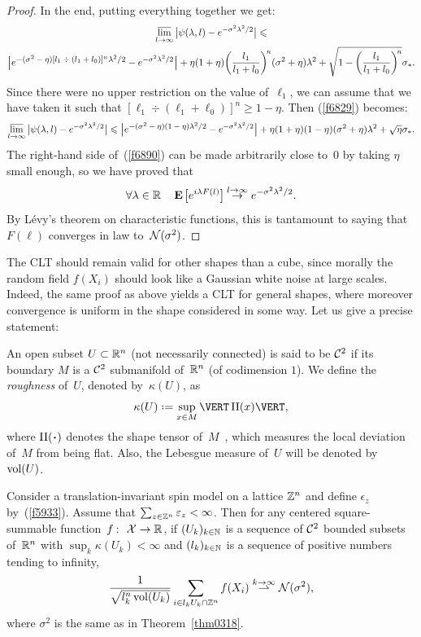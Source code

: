 \begin{proof}
In the end, putting everything together we get:
\begin{multline}\label{f6829}
\limsup_{\ell\longto\infty} \big| \psi(\lambda,\ell) - e^{-\sigma^2\lambda^2/2} \big| \leq \\
\Big|e^{\big{-(\sigma^2-\eta) [\ell_1 \div (\ell_1+\ell_0)]^n \lambda^2/2}} - e^{-\sigma^2\lambda^2/2}\Big|
+ \eta(1+\eta) \bigg( \frac{\ell_1}{\ell_1+\ell_0} \bigg)^{\!n} (\sigma^2+\eta) \lambda^2
+ \sqrt{ 1-\bigg(\frac{\ell_1}{\ell_1+\ell_0}\bigg)^{\!n} } \sigma_* .
\end{multline}
%
Since there were no upper restriction on the value of~$\ell_1$, we can assume
that we have taken it such that $[\ell_1 \div (\ell_1+\ell_0)]^n \geq 1-\eta$.
Then (\ref{f6829}) becomes:
\[\label{f6890} \limsup_{\ell\longto\infty}
\big| \psi(\lambda,\ell) - e^{-\sigma^2\lambda^2/2} \big| \leq
\Big| e^{\big{-(\sigma^2-\eta)(1-\eta)\lambda^2/2}} - e^{-\sigma^2\lambda^2/2} \Big|
+ \eta(1+\eta)(1-\eta) (\sigma^2+\eta) \lambda^2
+ \sqrt{\eta} \sigma_* .\]
%
The right-hand side of~(\ref{f6890}) can be made arbitrarily close to~$0$
by taking $\eta$ small enough, so we have proved that
%
\[ \forall \lambda \in \RR \quad \EE\big[e^{i\lambda F(\ell)}\big]
\stackrel{\ell\longto\infty}{\longto} e^{-\sigma^2\lambda^2/2} .\]
By L\'evy's theorem on characteristic functions,
this is tantamount to saying that $F(\ell)$ converges in law to~$\mathcal{N}(\sigma^2)$.
\end{proof}

The CLT should remain valid for other shapes than a cube,
since morally the random field $f(X_i)$
should look like a Gaussian white noise at large scales.
Indeed, the same proof as above yields a CLT for general shapes,
where moreover convergence is uniform in the shape considered in some way.
Let us give a precise statement:
%
\begin{Def}
An open subset $U \subset \mathbb{R}^n$ (not necessarily connected)
is said to be \emph{$\mathcal{C}^2$} if its boundary $M$ is a $\mathcal{C}^2$ submanifold
of~$\mathbb{R}^n$ (of codimension $1$).
We define the \emph{roughness} of~$U$, denoted by~$\kappa(U)$, as
\[ \kappa(U) \coloneqq \sup_{x\in M} \VERT \II(x) \VERT, \]
where $\II(\Bcdot)$ denotes the shape tensor of~$M$~\cite[Chapter~10]{Differential},
which measures the local deviation of~$M$ from being flat.
Also, the Lebesgue measure of~$U$ will be denoted by~$\operatorname{vol}(U)$.
\end{Def}

\begin{Thm}\label{thm3015}
Consider a translation-invariant spin model on a lattice $\mathbb{Z}^n$
and define $\epsilon_z$ by~(\ref{f5933}).
Assume that $\sum_{z\in\mathbb{Z}^n} \varepsilon_z < \infty$.
Then for any centered square-summable function~$f \colon \mcal{X} \to \RR$,
if $(U_k)_{k\in\mathbb{N}}$ is a sequence of $\mathcal{C}^2$ bounded subsets of~$\mathbb{R}^n$
with $\sup_k \kappa(U_k) < \infty$ and
$(l_k)_{k\in\mathbb{N}}$ is a sequence of positive numbers tending to infinity,
\[ \frac{1}{\sqrt{l_k^n\operatorname{vol}(U_k)}} \sum_{i\in l_kU_k\cap\mathbb{Z}^n} f(X_i)
\stackrel{k\to\infty}{\rightharpoonup} \mathcal{N}(\sigma^2) ,\]
where $\sigma^2$ is the same as in Theorem~\ref{thm0318}.
\end{Thm}

